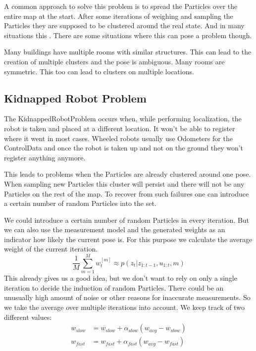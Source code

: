 A common approach to solve this problem is to spread the \gls{Particle}s over the entire map at the start. After some iterations of weighing and sampling the \gls{Particle}s they are supposed to be clustered around the real state. And in many situations this . There are some situations where this can pose a problem though.

Many buildings have multiple rooms with similar structures. This can lead to the creation of multiple clusters and the pose is ambiguous. Many rooms are symmetric. This too can lead to clusters on multiple locations. 
\subsection{Kidnapped Robot Problem} \label{sec:krp}
The \gls{KidnappedRobotProblem} occurs when, while performing localization, the robot is taken and placed at a different location. It won't be able to register where it went in most cases. Wheeled robots usually use \gls{Odometer}s for the \gls{ControlData} and once the robot is taken up and not on the ground they won't register anything anymore. 

This leads to problems when the \gls{Particle}s are already clustered around one pose. When sampling new \gls{Particle}s this cluster will persist and there will not be any \gls{Particle}s on the rest of the map. To recover from such failures one can introduce a certain number of random \gls{Particle}s into the set\citep[p. 256]{Thrun:2005:PR:1121596}.

We could introduce a certain number of random \gls{Particle}s in every iteration. But we can also use the measurement model and the generated weights as an indicator how likely the current pose is. For this purpose we calculate the average weight of the current iteration\citep[p. 257]{Thrun:2005:PR:1121596}.
\begin{equation}
\dfrac{1}{M}\sum_{m=1}^{M}w_t^{[m]} \approx p(z_t|z_{1:t-1},u_{1:t},m)
\end{equation}
This already gives us a good idea, but we don't want to rely on only a single iteration to decide the induction of random \gls{Particle}s. There could be an unusually high amount of noise or other reasons for inaccurate measurements. So we take the average over multiple iterations into account. We keep track of two different values:
\begin{equation}\label{eq:decay}
\begin{aligned}
w_{slow} &= w_{slow} + \alpha_{slow}(w_{avg}-w_{slow})\\
w_{fast} &= w_{fast} + \alpha_{fast}(w_{avg}-w_{fast})
\end{aligned}
\end{equation}

